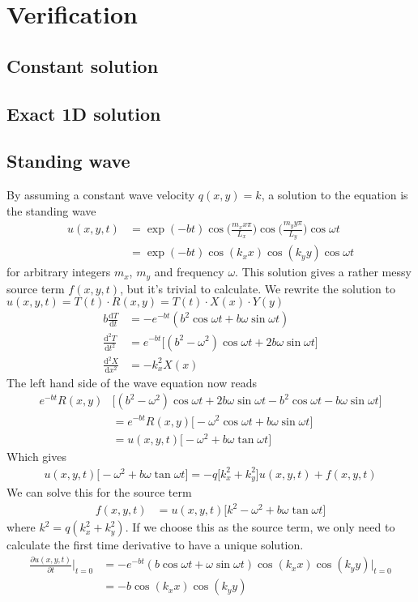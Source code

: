 \documentclass[a4paper,10pt]{article}
\renewcommand{\(}{\left(}
\renewcommand{\)}{\right)}
\newcommand{\dd}[2]{\frac{\mathrm{d}#1}{\mathrm{d}#2}}
\newcommand{\ddd}[2]{\frac{\mathrm{d^2}#1}{\mathrm{d}#2^2}}
\newcommand{\dpart}[2]{\frac{\partial#1}{\partial#2}}
\newcommand{\f}[2]{\frac{#1}{#2}}
\begin{document}
\section*{Verification}
\subsection*{Constant solution}
\subsection*{Exact 1D solution}
\subsection*{Standing wave}
By assuming a constant wave velocity $q(x,y)=k$, a solution to the equation is the standing wave
\begin{align*}
u(x,y,t) &= \exp(-bt)\cos\Big(\f{m_xx\pi}{L_x}\Big)\cos\Big(\f{m_yy\pi}{L_y}\Big)\cos{\omega t}\\
&= \exp(-bt)\cos (k_x x)\cos (k_y y)\cos{\omega t}
\end{align*}
for arbitrary integers $m_x$, $m_y$ and frequency $\omega$. This solution gives a rather messy source term $f(x,y,t)$, but it's trivial to calculate. We rewrite the solution to $u(x,y,t) = T(t)\cdot R(x,y)=T(t)\cdot X(x) \cdot Y(y)$
\begin{align*}
b\dd{T}{t} &= -e^{-bt}(b^2\cos \omega t + b\omega \sin \omega t)\\
\ddd{T}{t} &= e^{-bt}\Big[(b^2 - \omega^2)\cos\omega t + 2b\omega\sin\omega t\Big] \\
\ddd{X}{x} &= - k_x^2 X(x)
\end{align*}
The left hand side of the wave equation now reads
\begin{align*}
e^{-bt}R(x,y)&\Big[ (b^2 - \omega^2)\cos\omega t + 2b\omega\sin\omega t -b^2\cos \omega t - b\omega \sin \omega t \Big]\\
& = e^{-bt}R(x,y)\Big[-\omega^2\cos\omega t + b\omega\sin\omega t\Big]\\
& = u(x,y,t)\Big[-\omega^2 + b\omega\tan\omega t\Big]
\end{align*}
Which gives
\begin{align*}
u(x,y,t)\Big[-\omega^2 + b\omega\tan\omega t\Big] = -q\big[ k_x^2 + k_y^2 \big]u(x,y,t) + f(x,y,t)
\end{align*}
We can solve this for the source term
\begin{align*}
f(x,y,t) &= u(x,y,t)\Big[ k^2 - \omega^2 + b\omega \tan\omega t\Big]
\end{align*}
where $k^2=q(k_x^2 + k_y^2)$. If we choose this as the source term, we only need to calculate the first time derivative to have a unique solution.
\begin{align*}
\dpart{u(x,y,t)}{t}\Big|_{t=0} &= -e^{-bt}(b\cos\omega t + \omega \sin\omega t)\cos(k_xx)\cos(k_yy)\Big|_{t=0}\\
&= -b\cos(k_xx)\cos(k_yy)
\end{align*}
\end{document}
